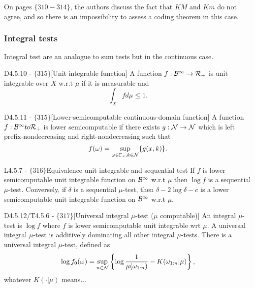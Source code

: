 \documentclass{article}
\begin{document}
On pages $\{310-314\}$, the authors discuss the fact that $KM$ and $Km$ do not agree, and so there is an impossibility to assess a coding theorem in this case.

\subsubsection{Integral tests}

Integral test are an analogue to sum tests but in the continuous case.

\begin{flexidefinition}{D4.5.10 - $\{315\}$}[Unit integrable function]
    A function $f : \mathcal{B}^\infty \to \mathcal{R}_+$ is unit integrable over $X$ w.r.t $\mu$ if it is measurable and 
    \begin{equation}
        \int_X f d \mu \leq 1.
    \end{equation}
\end{flexidefinition}

\begin{flexidefinition}{D4.5.11 - $\{315\}$}[Lower-semicomputable continuous-domain function]
    A function $f : \mathcal{B}^\infty to \mathcal{R}_+$ is lower semicomputable if there exists $g : \mathcal{N} \to \mathcal{N}$ which is left prefix-nondecreasing and right-nondecreasing such that
    \begin{equation}
        f(\omega) = \sup_{\omega \in \Gamma_x, k \in \mathcal{N}} \{ g(x,k)\}.
    \end{equation}
\end{flexidefinition}

\begin{flexitheorem}{L4.5.7 - $\{316\}$}{Equivalence unit integrable and sequential test}
    If $f$ is lower semicomputable unit integrable function on $\mathcal{B}^\infty$ w.r.t $\mu$ then $\log f$ is a sequential $\mu$-test. Conversely, if $\delta$ is a sequential $\mu$-test, then $\delta - 2 \log \delta -c$ is a lower semicomputable unit integrable function on $\mathcal{B}^\infty$ w.r.t $\mu$.
\end{flexitheorem}

\begin{flexitheorem}{D4.5.12/T4.5.6 - $\{317\}$}[Universal integral $\mu$-test ($\mu$ computable)]
    An integral $\mu$-test is $\log f$ where $f$ is lower semicomputable unit integrable wrt $\mu$. A universal integral $\mu$-test is additively dominating all other integral $\mu$-tests. There is a universal integral $\mu$-test, defined as
    \begin{equation}
        \log f_0(\omega) = \sup_{n \in \mathcal{N}} \left\{ \log \frac{1}{\mu(\omega_{1:n})} - K(\omega_{1:n}|\mu) \right\},
    \end{equation}
    whatever $K(\cdot | \mu)$ means...
\end{flexitheorem}
\end{document}
